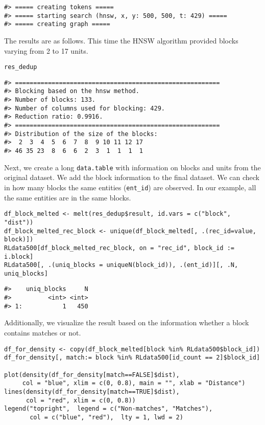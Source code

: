 \begin{verbatim}
#> ===== creating tokens =====
#> ===== starting search (hnsw, x, y: 500, 500, t: 429) =====
#> ===== creating graph =====
\end{verbatim}

The results are as follows. This time the HNSW algorithm provided blocks varying from 2 to 17 units.

\begin{verbatim}
res_dedup
\end{verbatim}

\begin{verbatim}
#> ========================================================
#> Blocking based on the hnsw method.
#> Number of blocks: 133.
#> Number of columns used for blocking: 429.
#> Reduction ratio: 0.9916.
#> ========================================================
#> Distribution of the size of the blocks:
#>  2  3  4  5  6  7  8  9 10 11 12 17
#> 46 35 23  8  6  6  2  3  1  1  1  1
\end{verbatim}

Next, we create a long \texttt{data.table} with information on blocks and units from
the original dataset. We add the block information to the final dataset.
We can check in how many blocks the same entities (\texttt{ent\_id}) are
observed. In our example, all the same entities are in the same blocks.

\begin{verbatim}
df_block_melted <- melt(res_dedup$result, id.vars = c("block", "dist"))
df_block_melted_rec_block <- unique(df_block_melted[, .(rec_id=value, block)])
RLdata500[df_block_melted_rec_block, on = "rec_id", block_id := i.block]
RLdata500[, .(uniq_blocks = uniqueN(block_id)), .(ent_id)][, .N, uniq_blocks]
\end{verbatim}

\begin{verbatim}
#>    uniq_blocks     N
#>          <int> <int>
#> 1:           1   450
\end{verbatim}

Additionally, we visualize the result based on the information whether a
block contains matches or not.

\begin{verbatim}
df_for_density <- copy(df_block_melted[block %in% RLdata500$block_id])
df_for_density[, match:= block %in% RLdata500[id_count == 2]$block_id]

plot(density(df_for_density[match==FALSE]$dist),
     col = "blue", xlim = c(0, 0.8), main = "", xlab = "Distance")
lines(density(df_for_density[match==TRUE]$dist),
      col = "red", xlim = c(0, 0.8))
legend("topright",  legend = c("Non-matches", "Matches"),
       col = c("blue", "red"),  lty = 1, lwd = 2)
\end{verbatim}

